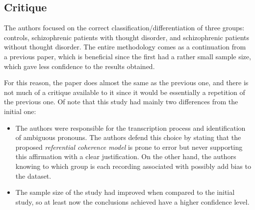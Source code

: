 \documentclass{Paper_Summary}
\begin{document}
\makepapertitle

\breakline

\begin{center}
    \section*{Critique}
\end{center}

    The authors focused on the correct classification/differentiation of three groups: controls, schizophrenic patients with thought disorder, and schizophrenic patients without thought disorder. The entire methodology comes as a continuation from a previous paper, which is beneficial since the first had a rather small sample size, which gave less confidence to the results obtained.

    For this reason, the paper does almost the same as the previous one, and there is not much of a critique available to it since it would be essentially a repetition of the previous one. Of note that this study had mainly two differences from the initial one:
    \begin{itemize}
        \item The authors were responsible for the transcription process and identification of ambiguous pronouns. The authors defend this choice by stating that the proposed \emph{referential coherence model} is prone to error but never supporting this affirmation with a clear justification. On the other hand, the authors knowing to which group is each recording associated with possibly add bias to the dataset.
        \item The sample size of the study had improved when compared to the initial study, so at least now the conclusions achieved have a higher confidence level.
    \end{itemize}

\breakline
\end{document}
